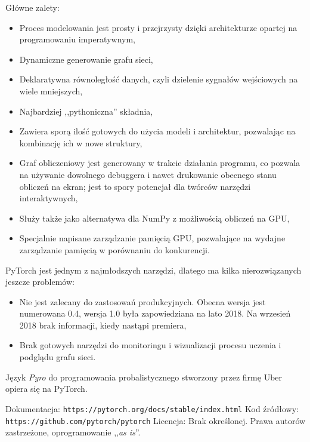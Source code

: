 \documentclass[12pt,a4paper,twoside,titlepage,openright]{book}
\begin{document}
\begin{itemize}
\begin{itemize}
Główne zalety:
\begin{itemize}
\item Proces modelowania jest prosty i przejrzysty dzięki architekturze opartej na programowaniu imperatywnym,
\item Dynamiczne generowanie grafu sieci,
\item Deklaratywna równoległość danych, czyli dzielenie sygnałów wejściowych na wiele mniejszych,
\item Najbardziej ,,pythoniczna'' składnia,
\item Zawiera sporą ilość gotowych do użycia modeli i architektur, pozwalając na kombinację ich w nowe struktury,
\item Graf obliczeniowy jest generowany w trakcie działania programu, co pozwala na używanie dowolnego debuggera i nawet drukowanie obecnego stanu obliczeń na ekran; jest to spory potencjał dla twórców narzędzi interaktywnych,
\item Służy także jako alternatywa dla NumPy z możliwością obliczeń na GPU,
\item Specjalnie napisane zarządzanie pamięcią GPU, pozwalające na wydajne zarządzanie pamięcią w porównaniu do konkurencji.
\end{itemize}

PyTorch jest jednym z najmłodszych narzędzi, dlatego ma kilka nierozwiązanych jeszcze problemów:
\begin{itemize}
\item Nie jest zalecany do zastosowań produkcyjnych. Obecna wersja jest numerowana 0.4, wersja 1.0 była zapowiedziana na lato 2018. Na wrzesień 2018 brak informacji, kiedy nastąpi premiera,
\item Brak gotowych narzędzi do monitoringu i wizualizacji procesu uczenia i podglądu grafu sieci.
\end{itemize}

Język \textit{Pyro} do programowania probalistycznego stworzony przez firmę Uber opiera się na PyTorch.\cite{book:2226069}

\noindent
\newline
Dokumentacja: \texttt{https://pytorch.org/docs/stable/index.html}
\newline
Kod źródłowy: \texttt{https://github.com/pytorch/pytorch}
\newline
Licencja: Brak określonej. Prawa autorów zastrzeżone, oprogramowanie ,,\textit{as is}''.



\end{itemize}
\end{itemize}
\end{document}
